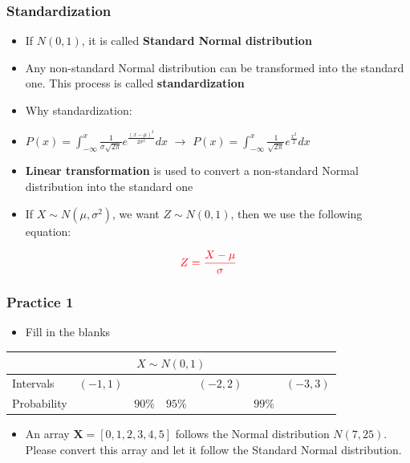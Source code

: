 \documentclass[handout]{beamer}
\begin{document}
\begin{frame}
    \frametitle{Standardization}
    \begin{itemize}[wide = 0pt]
        \item[$\square$] If $N(0,1)$, it is called \textbf{\color{red}Standard Normal distribution}
        \item[$\square$] Any non-standard Normal distribution can be transformed into the standard one. This process is called \textbf{standardization}
        \item[$\square$] Why standardization: 
        \item[\ \ ] $P(x)=\int_{-\infty}^x\frac{1}{\sigma\sqrt{2\pi}}e^{\frac{(x-\mu)^2}{2\sigma^2}}dx$ $\rightarrow$ $P(x)=\int_{-\infty}^x\frac{1}{\sqrt{2\pi}}e^{\frac{x^2}{2}}dx$ 
        \item[$\square$] \textbf{Linear transformation} is used to convert a non-standard Normal distribution into the standard one
        \item[$\square$] If $X \sim N(\mu, \sigma^2)$, we want $Z \sim N(0, 1)$, then we use the following equation:
    \end{itemize}
    \begin{equation*}
        \color{red} Z=\frac{X-\mu}{\sigma}
    \end{equation*}
    \vspace*{\fill}
\end{frame}

\begin{frame}
    \frametitle{Practice 1}
    \begin{itemize}[wide = 0pt]
        \item[$\square$] Fill in the blanks
    \end{itemize}
    \begin{tabular}{l c c c c c c}
		\toprule
        \multicolumn{7}{c}{\textbf{$X \sim N(0,1)$}}  \\
        \midrule
			 Intervals & $(-1, 1)$ & & & $(-2,2)$ & & $(-3,3)$ \\
			 Probability & & $90\%$ & $95\%$ & & $99\%$ & \\
        \bottomrule
	\end{tabular}
	\vspace{20pt}
	\begin{itemize}[wide = 0pt]
        \item[$\square$] An array $\textbf{X}=[0, 1, 2, 3, 4, 5]$ follows the Normal distribution $N(7,25)$. Please convert this array and let it follow the Standard Normal distribution.
    \end{itemize}
    \vspace{\fill}
\end{frame}
\end{document}
